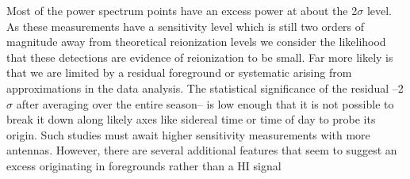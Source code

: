 \documentclass{aastex}
\begin{document}
Most of the power spectrum points have an excess power at about the 2$\sigma$ level.  As these measurements have a sensitivity level which is still two orders of magnitude away from theoretical reionization levels we consider the likelihood that these detections are evidence of reionization to be small. Far more likely is that we are limited by a residual foreground or systematic arising from approximations in the data analysis.  The statistical significance of the residual --2$\sigma$ after averaging over the entire season-- is low enough that it is not possible to break it down along likely axes like sidereal time or time of day to probe its origin.  Such studies must await higher sensitivity measurements with more antennas.  However, there are several additional features that seem to suggest an excess originating in foregrounds rather than a HI signal



\end{document}
